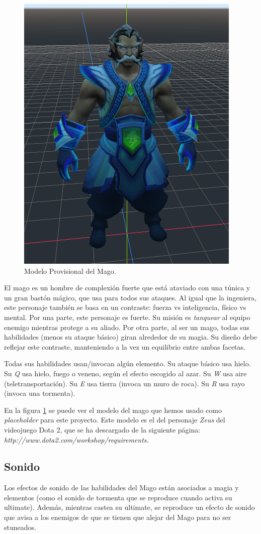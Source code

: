 \begin{figure}[h]
	\centering
	\includegraphics[width=0.6\linewidth]{figures/MageModel.png}
	\caption{Modelo Provisional del Mago.}
	\label{fig:MageModel}
\end{figure}

El mago es un hombre de complexión fuerte que está ataviado con una túnica y un gran bastón mágico, que usa para todos sus ataques. Al igual que la ingeniera, este personaje también se basa en un contraste: fuerza vs inteligencia, físico vs mental. Por una parte, este personaje es fuerte. Su misión es \emph{tanquear} al equipo enemigo mientras protege a su aliado. Por otra parte, al ser un mago, todas sus habilidades (menos su ataque básico) giran alrededor de su magia. Su diseño debe reflejar este contraste, manteniendo a la vez un equilibrio entre ambas facetas.

Todas sus habilidades usan/invocan algún elemento. Su ataque básico usa hielo. Su \emph{Q} usa hielo, fuego o veneno, según el efecto escogido al azar. Su \emph{W} usa aire (teletransportación). Su \emph{E} usa tierra (invoca un muro de roca). Su \emph{R} usa rayo (invoca una tormenta).

En la figura \ref{fig:MageModel} se puede ver el modelo del mago que hemos usado como \emph{placeholder} para este proyecto. Este modelo es el del personaje \emph{Zeus} del videojuego Dota 2, que se ha descargado de la siguiente página: \emph{http://www.dota2.com/workshop/requirements}.

\subsection{Sonido}
Los efectos de sonido de las habilidades del Mago están asociados a magia y elementos (como el sonido de tormenta que se reproduce cuando activa su ultimate). Además, mientras castea su ultimate, se reproduce un efecto de sonido que avisa a los enemigos de que se tienen que alejar del Mago para no ser stuneados.